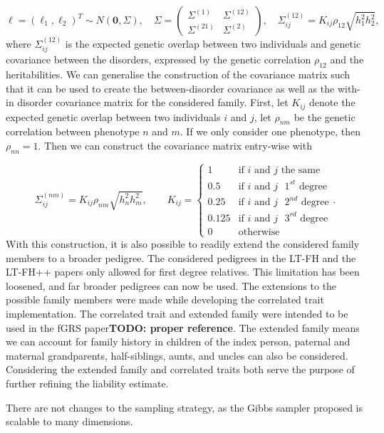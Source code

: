\begin{equation*}
	\ell = \left(\ell_1, \ell_2\right)^T \sim N(\mathbf{0}, \Sigma), \quad \Sigma = 
	\begin{pmatrix} 
		\Sigma^{(1)} & \Sigma^{(12)} \\
		\Sigma^{(21)} & \Sigma^{(2)} 
	\end{pmatrix}, \quad \Sigma^{(12)}_{ij} = K_{ij}\rho_{12}\sqrt{h_1^2 h_2^2},
\end{equation*}
where $ \Sigma_{ij}^{(12)} $ is the expected genetic overlap between two individuals and genetic covariance between the disorders, expressed by the genetic correlation $ \rho_{12} $ and the heritabilities. We can generalise the construction of the covariance matrix such that it can be used to create the between-disorder covariance as well as the with-in disorder covariance matrix for the considered family. First, let $ K_{ij} $ denote the expected genetic overlap between two individuals $ i $ and $ j $, let $ \rho_{nm} $ be the genetic correlation between phenotype $ n $ and $ m $. If we only consider one phenotype, then $ \rho_{nn} = 1$. Then we can construct the covariance matrix entry-wise with 

\begin{equation*}
	\Sigma^{(nm)}_{ij} = K_{ij} \rho_{nm}\sqrt{h^2_{n}h^2_{m}}, \qquad K_{ij} = 
	\begin{cases} 
		1 		& \text{if } i \text{ and } j \text{ the same} \\
		0.5 	& \text{if } i \text{ and } j \text{ $1^{st}$ degree} \\
		0.25 	& \text{if } i \text{ and } j \text{ $2^{nd}$ degree} \\ 
		0.125 	& \text{if } i \text{ and } j \text{ $3^{rd}$ degree}  \\
		0 		& \text{otherwise}
	\end{cases}.
\end{equation*}
With this construction, it is also possible to readily extend the considered family members to a broader pedigree. The considered pedigrees in the LT-FH and the LT-FH++ papers only allowed for first degree relatives. This limitation has been loosened, and far broader pedigrees can now be used. The extensions to the possible family members were made while developing the correlated trait implementation. The correlated trait and extended family were intended to be used in the fGRS paper\textbf{TODO: proper reference}. The extended family means we can account for family history in children of the index person, paternal and maternal grandparents, half-siblings, aunts, and uncles can also be considered. Considering the extended family and correlated traits both serve the purpose of further refining the liability estimate.

There are not changes to the sampling strategy, as the Gibbs sampler proposed is scalable to many dimensions.
